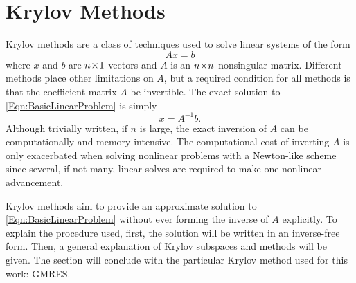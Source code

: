 \documentclass[12pt]{UWMadThesis}
\begin{document}
\section{Krylov Methods}
Krylov methods are a class of techniques used to solve linear systems of the form
\begin{equation}
    A x = b
    \label{Eqn:BasicLinearProblem}
\end{equation}
where $x$ and $b$ are $n \!\times\! 1$ vectors and $A$ is an $n \!\times\! n$ nonsingular matrix.
Different methods place other limitations on $A$, but a required condition for all methods is that the coefficient matrix $A$ be invertible.
The exact solution to \cref{Eqn:BasicLinearProblem} is simply
\begin{equation}
    x = A^{-1} b.
    \label{Eqn:BasicLinearSolution}
\end{equation}
Although trivially written, if $n$ is large, the exact inversion of $A$ can be computationally and memory intensive.
The computational cost of inverting $A$ is only exacerbated when solving nonlinear problems with a Newton-like scheme since several, if not many, linear solves are required to make one nonlinear advancement.

Krylov methods aim to provide an approximate solution to \cref{Eqn:BasicLinearProblem} without ever forming the inverse of $A$ explicitly.
To explain the procedure used, first, the solution will be written in an inverse-free form.
Then, a general explanation of Krylov subspaces and methods will be given.
The section will conclude with the particular Krylov method used for this work: GMRES.
\end{document}
